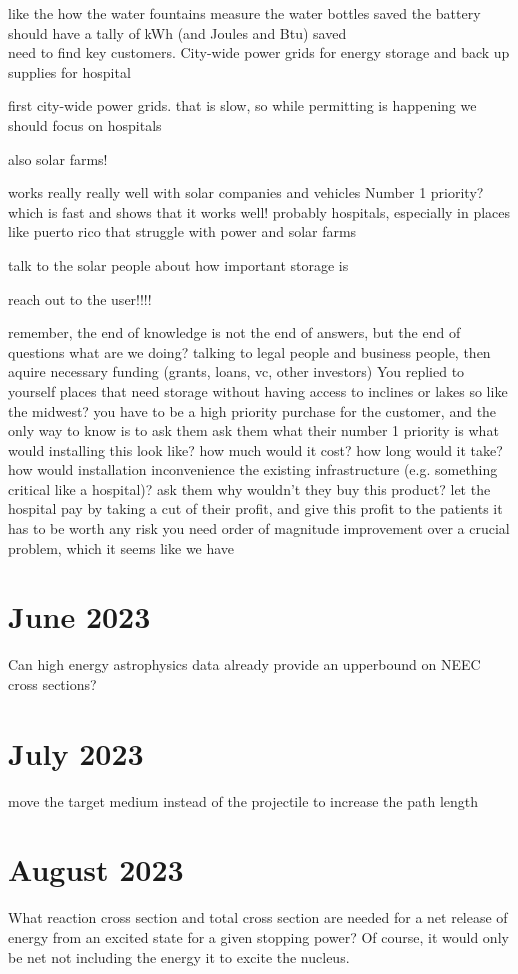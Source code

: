 \documentclass[12pt]{article}
\begin{document}
like the how the water fountains measure the water bottles saved the battery should have a tally of kWh (and Joules and Btu) saved\\

need to find key customers. City-wide power grids for energy storage and back up supplies for hospital

first city-wide power grids. that is slow, so while permitting is happening we should focus on hospitals

also solar farms!

works really really well with solar companies and vehicles
Number 1 priority? which is fast and shows that it works well! probably hospitals, especially in places like puerto rico that struggle with power and solar farms

talk to the solar people about how important storage is

reach out to the user!!!!

remember, the end of knowledge is not the end of answers, but the end of questions
what are we doing?
talking to legal people and business people, then aquire necessary funding (grants, loans, vc, other investors)
You replied to yourself
places that need storage without having access to inclines or lakes
so like the midwest?
you have to be a high priority purchase for the customer, and the only way to know is to ask them
ask them what their number 1 priority is
what would installing this look like? how much would it cost? how long would it take? how would installation inconvenience the existing infrastructure (e.g. something critical like a hospital)?
ask them why wouldn't they buy this product?
let the hospital pay by taking a cut of their profit, and give this profit to the patients
it has to be worth any risk
you need order of magnitude improvement over a crucial problem, which it seems like we have
\section{June 2023}
Can high energy astrophysics data already provide an upperbound on NEEC cross sections? \\
\section{July 2023}
move the target medium instead of the projectile to increase the path length
\section{August 2023}
What reaction cross section and total cross section are needed for a net release of energy from an excited state for a given stopping power? Of course, it would only be net not including the energy it to excite the nucleus.   
\end{document}
